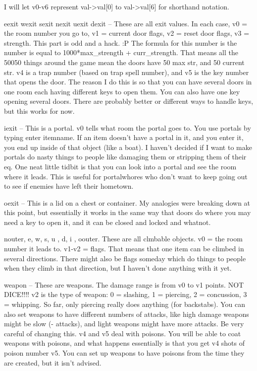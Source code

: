I will let v0-v6 represent val->val[0] to val->val[6] for shorthand notation.

\bul eexit wexit sexit nexit uexit dexit -- These are all exit
values. In each case, v0 = the room number you go to, v1 = current
door flags, v2 = reset door flags, v3 = strength. This part is odd and
a hack. :P The formula for this number is the number is equal to
1000*max\_strength + curr\_strength. That means all the 50050 things
around the game mean the doors have 50 max str, and 50 current str. v4
is a trap number (based on trap spell number), and v5 is the key
number that opens the door. The reason I do this is so that you can
have several doors in one room each having different keys to open
them. You can also have one key opening several doors. There are
probably better or different ways to handle keys, but this works for
now.

\bul iexit -- This is a portal. v0 tells what room the portal goes
to. You use portals by typing enter itemname. If an item doesn't have
a portal in it, and you enter it, you end up inside of that object
(like a boat). I haven't decided if I want to make portals do nasty
things to people like damaging them or stripping them of their eq. One
neat little tidbit is that you can look into a portal and see the room
where it leads. This is useful for portalwhores who don't want to keep
going out to see if enemies have left their hometown.

\bul oexit -- This is a lid on a chest or container. My analogies were
breaking down at this point, but essentially it works in the same way
that doors do where you may need a key to open it, and it can be
closed and locked and whatnot.

\bul nouter, e, w, s, u , d, i , oouter. These are all clmbable
objects. v0 = the room number it leads to. v1-v2 = flags. That means
that one item can be climbed in several directions. There might also
be flags someday which do things to people when they climb in that
direction, but I haven't done anything with it yet.

\bul weapon -- These are weapons. The damage range is from v0 to v1
points. NOT DICE!!!! v2 is the type of weapon: 0 = slashing, 1 =
piercing, 2 = concussion, 3 = whipping. So far, only piercing really
does anything (for backstabs). You can also set weapons to have
different numbers of attacks, like high damage weapons might be slow
(- attacks), and light weapons might have more attacks. Be very
careful of changing this. v4 and v5 deal with poisons. You will be
able to coat weapons with poisons, and what happens essentially is
that you get v4 shots of poison number v5. You can set up weapons to
have poisons from the time they are created, but it isn't advised.

